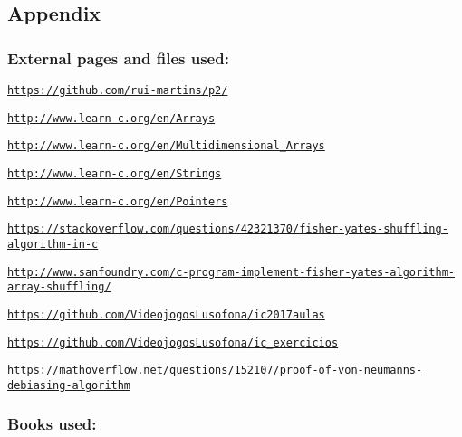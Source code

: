 \subsection*{Appendix}

\subsubsection*{External pages and files used\+:}


\begin{DoxyItemize}
\item \href{https://github.com/rui-martins/p2/}{\tt https\+://github.\+com/rui-\/martins/p2/}
\item \href{http://www.learn-c.org/en/Arrays}{\tt http\+://www.\+learn-\/c.\+org/en/\+Arrays}
\item \href{http://www.learn-c.org/en/Multidimensional_Arrays}{\tt http\+://www.\+learn-\/c.\+org/en/\+Multidimensional\+\_\+\+Arrays}
\item \href{http://www.learn-c.org/en/Strings}{\tt http\+://www.\+learn-\/c.\+org/en/\+Strings}
\item \href{http://www.learn-c.org/en/Pointers}{\tt http\+://www.\+learn-\/c.\+org/en/\+Pointers}
\item \href{https://stackoverflow.com/questions/42321370/fisher-yates-shuffling-algorithm-in-c}{\tt https\+://stackoverflow.\+com/questions/42321370/fisher-\/yates-\/shuffling-\/algorithm-\/in-\/c}
\item \href{http://www.sanfoundry.com/c-program-implement-fisher-yates-algorithm-array-shuffling/}{\tt http\+://www.\+sanfoundry.\+com/c-\/program-\/implement-\/fisher-\/yates-\/algorithm-\/array-\/shuffling/}
\item \href{https://github.com/VideojogosLusofona/ic2017aulas}{\tt https\+://github.\+com/\+Videojogos\+Lusofona/ic2017aulas}
\item \href{https://github.com/VideojogosLusofona/ic_exercicios}{\tt https\+://github.\+com/\+Videojogos\+Lusofona/ic\+\_\+exercicios}
\item \href{https://mathoverflow.net/questions/152107/proof-of-von-neumanns-debiasing-algorithm}{\tt https\+://mathoverflow.\+net/questions/152107/proof-\/of-\/von-\/neumanns-\/debiasing-\/algorithm}
\end{DoxyItemize}

\subsubsection*{Books used\+:}


